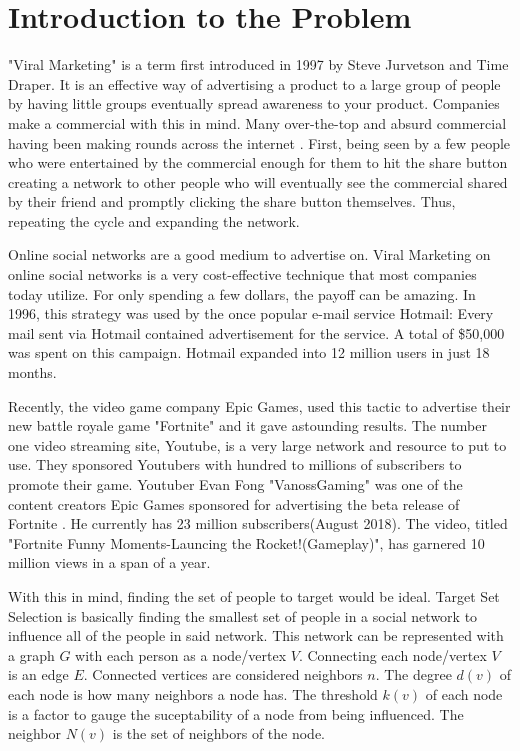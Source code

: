 \section{Introduction to the Problem}"Viral Marketing" is a term first introduced in 1997 by Steve Jurvetson and Time Draper\cite{viralmarketing}. It is an effective way of advertising a product to a large group of people by having little groups eventually spread awareness to your product. Companies make a commercial with this in mind. Many over-the-top and absurd commercial having been making rounds across the internet \cite{commercialrise}. First, being seen by a few people who were entertained by the commercial enough for them to hit the share button creating a network to other people who will eventually see the commercial shared by their friend and promptly clicking the share button themselves. Thus, repeating the cycle and expanding the network. 

Online social networks are a good medium to advertise on. Viral Marketing on online social networks is a very cost-effective technique that most companies today utilize. For only spending a few dollars, the payoff can be amazing.\cite{viralmarketing} In 1996, this strategy was used by the once popular e-mail service Hotmail: Every mail sent via Hotmail contained advertisement for the service. A total of \$50,000 was spent on this campaign. Hotmail expanded into 12 million users in just 18 months.\cite{viralmarketing} 

Recently, the video game company Epic Games, used this tactic to advertise their new battle royale game "Fortnite" and it gave astounding results. The number one video streaming site, Youtube, is a very large network and resource to put to use. They sponsored Youtubers with hundred to millions of subscribers to promote their game.\cite{sponsoredvideos} Youtuber Evan Fong "VanossGaming" was one of the content creators Epic Games sponsored for advertising the beta release of Fortnite \cite{vanoss}. He currently has 23 million subscribers(August 2018). The video, titled "Fortnite Funny Moments-Launcing the Rocket!(Gameplay)", has garnered 10 million views in a span of a year.

With this in mind, finding the set of people to target would be ideal. Target Set Selection is basically finding the smallest set of people in a social network to influence all of the people in said network.\cite{Kempe,chen,Shakarian:2012:LSN:2456719.2457081} This network can be represented with a graph $G$ with each person as a node/vertex $V$. Connecting each node/vertex $V$ is an edge $E$. Connected vertices are considered neighbors $n$. The degree $d(v)$ of each node is how many neighbors a node has. The threshold $k(v)$ of each node is a factor to gauge the suceptability of a node from being influenced. The neighbor $N(v)$ is the set of neighbors of the node. 

